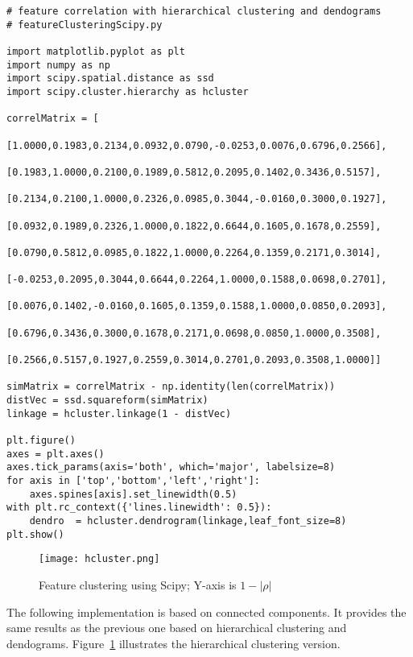 \documentclass[oneside,10pt]{book}
\begin{document}
\begin{lstlisting}
# feature correlation with hierarchical clustering and dendograms
# featureClusteringScipy.py

import matplotlib.pyplot as plt
import numpy as np
import scipy.spatial.distance as ssd
import scipy.cluster.hierarchy as hcluster

correlMatrix = [
      [1.0000,0.1983,0.2134,0.0932,0.0790,-0.0253,0.0076,0.6796,0.2566],
      [0.1983,1.0000,0.2100,0.1989,0.5812,0.2095,0.1402,0.3436,0.5157],
      [0.2134,0.2100,1.0000,0.2326,0.0985,0.3044,-0.0160,0.3000,0.1927],
      [0.0932,0.1989,0.2326,1.0000,0.1822,0.6644,0.1605,0.1678,0.2559],
      [0.0790,0.5812,0.0985,0.1822,1.0000,0.2264,0.1359,0.2171,0.3014],
      [-0.0253,0.2095,0.3044,0.6644,0.2264,1.0000,0.1588,0.0698,0.2701],
      [0.0076,0.1402,-0.0160,0.1605,0.1359,0.1588,1.0000,0.0850,0.2093],
      [0.6796,0.3436,0.3000,0.1678,0.2171,0.0698,0.0850,1.0000,0.3508],
      [0.2566,0.5157,0.1927,0.2559,0.3014,0.2701,0.2093,0.3508,1.0000]]

simMatrix = correlMatrix - np.identity(len(correlMatrix)) 
distVec = ssd.squareform(simMatrix)
linkage = hcluster.linkage(1 - distVec)

plt.figure()
axes = plt.axes()
axes.tick_params(axis='both', which='major', labelsize=8)
for axis in ['top','bottom','left','right']:
    axes.spines[axis].set_linewidth(0.5) 
with plt.rc_context({'lines.linewidth': 0.5}):
    dendro  = hcluster.dendrogram(linkage,leaf_font_size=8)
plt.show()
\end{lstlisting}


\begin{figure}[H]
\centering
\texttt{[image: hcluster.png]}  
\caption{Feature clustering using Scipy; Y-axis is $1-|\rho|$}
\label{fig:picbhggg2xs}
\end{figure}

\noindent The following implementation is based on connected components. It provides the same results as the
 previous one based on hierarchical clustering and dendograms. Figure~\ref{fig:picbhggg2xs} illustrates the
 hierarchical clustering version. \vspace{1ex}
\end{document}
